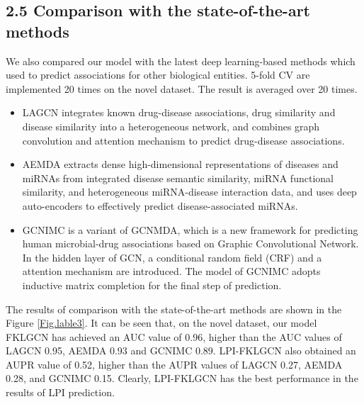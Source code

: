 \documentclass[fleqn,10pt]{wlscirep}
\begin{document}
\subsection*{2.5 Comparison with the state-of-the-art methods}
We also compared our model with the latest deep learning-based methods which used to predict associations for other biological entities. 5-fold CV are implemented 20 times on the novel dataset. The result is averaged over 20 times.
\begin{itemize}
\item LAGCN\cite{Yu2020c} integrates known drug-disease associations, drug similarity and disease similarity into a heterogeneous network, and combines graph convolution and attention mechanism to predict drug-disease associations.
\item AEMDA\cite{Ji2021} extracts dense high-dimensional representations of diseases and miRNAs from integrated disease semantic similarity, miRNA functional similarity, and heterogeneous miRNA-disease interaction data, and uses deep auto-encoders to effectively predict disease-associated miRNAs.
\item GCNIMC\cite{Long2020d} is a variant of GCNMDA, which is a new framework for predicting human microbial-drug associations based on Graphic Convolutional Network. In the hidden layer of GCN, a conditional random field (CRF) and a attention mechanism are introduced. The model of GCNIMC adopts inductive matrix completion for the final step of prediction.
\end{itemize}

The results of comparison with the state-of-the-art methods are shown in the Figure \ref{Fig.lable3}. It can be seen that, on the novel dataset, our model FKLGCN has achieved an AUC value of 0.96, higher than the AUC values of LAGCN 0.95, AEMDA 0.93 and GCNIMC 0.89. LPI-FKLGCN also obtained an AUPR value of 0.52, higher than the AUPR values of LAGCN 0.27, AEMDA 0.28, and GCNIMC 0.15. Clearly, LPI-FKLGCN has the best performance in the results of LPI prediction.
\end{document}

